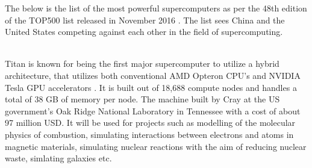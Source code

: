 \documentclass[fleqn,letterpaper,12pt]{report}
\begin{document}
\assignmenttitle

%
{}
\problem
The below is the list of the most powerful supercomputers as per the 48th edition of the TOP500 list released in November 2016 \cite{SC16}. The list sees China and the United States competing against each other in the field of supercomputing.
\begin{table}[h!]
\centering
\caption{Top 10 most powerful supercomputers, SC16, November, 2016}
\label{my-label}
\end{table}
%
\\
Titan is known for being the first major supercomputer to utilize a hybrid architecture, that utilizes both conventional AMD Opteron CPU's and NVIDIA Tesla GPU accelerators \cite{titan}. It is built out of 18,688 compute nodes and handles a total of 38 GB of memory per node. The machine built by Cray at the US government's Oak Ridge National Laboratory in Tennessee with a cost of about 97 million USD. It will be used for projects such as modelling of the molecular physics of combustion, simulating interactions between electrons and atoms in magnetic materials, simulating nuclear reactions with the aim of reducing nuclear waste, simlating galaxies etc.
\end{document}
